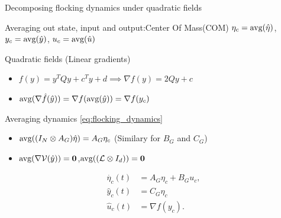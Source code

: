 \documentclass{beamer}
\begin{document}
\begin{frame}{Decomposing flocking dynamics under quadratic fields}
	\begin{block}{Averaging out state, input and output:Center Of Mass(COM)} $\eta_c=\textnormal{avg}(\hat{\eta})$, $y_c=\textnormal{avg}(\hat{y})$, $u_c=\textnormal{avg}(\hat{u})$
	\end{block}
	\begin{block}{Quadratic fields (Linear gradients)}
	\begin{itemize}
	\item $f(y)=y^T Q y + c^Ty + d \implies \nabla f (y)=2 Qy + c$
	\item $\textnormal{avg}(\nabla \hat{f}(\hat{y}))=\nabla f (\textnormal{avg}(\hat{y}))=\nabla f(y_c)$
	\end{itemize}
	\end{block}
	\begin{block}{Averaging dynamics \eqref{eq:flocking_dynamics}}
	\begin{itemize}
		\item $\textnormal{avg}((I_N \otimes A_G)\hat{\eta})=A_G{\eta_c}$ (Similary for $B_G$ and $C_G$)
		\item $\textnormal{avg}(\nabla \mathcal{V}(\hat{y}))=\mathbf{0}$,$\textnormal{avg}((\mathcal{L}\otimes I_d))=\mathbf{0}$ 
	\end{itemize}
	\end{block}
	\begin{equation}\label{eq:COM_dynamics}
		\begin{split}
			\Dot{\eta_c}(t)
			&=A_G \eta_c + B_G u_c,\\
			\hat{y}_c(t)
			&= C_G \eta_c\\
			\hat{u}_c(t)&=\nabla f (y_c).
		\end{split}
	\end{equation}
\end{frame}
\end{document}
